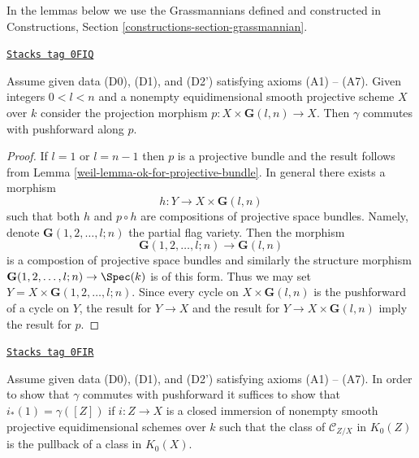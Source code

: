 In the lemmas below we use the Grassmannians defined and constructed
in Constructions, Section \ref{constructions-section-grassmannian}.

\begin{lemma}[Grassmanian]
\label{weil-lemma-grassmanian}
\href{https://stacks.math.columbia.edu/tag/0FIQ}{\texttt{Stacks tag 0FIQ}}

Assume given data (D0), (D1), and (D2') satisfying axioms (A1) -- (A7).
Given integers $0 < l < n$ and a nonempty equidimensional
smooth projective scheme $X$ over $k$ consider the projection morphism
$p : X \times \mathbf{G}(l, n) \to X$.
Then $\gamma$ commutes with pushforward along $p$.
\end{lemma}

\begin{proof}

If $l = 1$ or $l = n - 1$ then $p$ is a projective bundle and
the result follows from Lemma \ref{weil-lemma-ok-for-projective-bundle}.
In general there exists a morphism
$$
h : Y \to X \times \mathbf{G}(l, n)
$$
such that both $h$ and $p \circ h$ are compositions of projective
space bundles. Namely, denote $\mathbf{G}(1, 2, \ldots, l; n)$
the partial flag variety. Then the morphism
$$
\mathbf{G}(1, 2, \ldots, l; n) \to \mathbf{G}(l, n)
$$
is a compostion of projective space bundles and similarly the
structure morphism $\mathbf{G}(1, 2, \ldots, l; n) \to \Spec(k)$
is of this form. Thus we may set $Y = X \times \mathbf{G}(1, 2, \ldots, l; n)$.
Since every cycle on $X \times \mathbf{G}(l, n)$ is the pushforward of
a cycle on $Y$, the result for $Y \to X$ and the result for
$Y \to X \times \mathbf{G}(l, n)$ imply the result for $p$.
\end{proof}

\begin{lemma}
\label{weil-lemma-enough-better}
\href{https://stacks.math.columbia.edu/tag/0FIR}{\texttt{Stacks tag 0FIR}}

Assume given data (D0), (D1), and (D2') satisfying axioms (A1) -- (A7).
In order to show that $\gamma$ commutes with pushforward it suffices
to show that $i_*(1) = \gamma([Z])$ if $i : Z \to X$ is a closed
immersion of nonempty smooth projective equidimensional schemes over $k$
such that the class of $\mathcal{C}_{Z/X}$ in $K_0(Z)$ is the
pullback of a class in $K_0(X)$.
\end{lemma}


